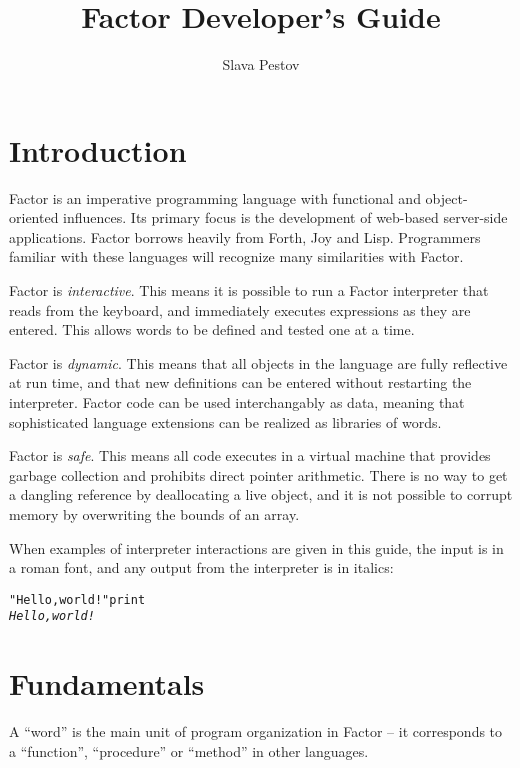 \documentclass[english]{article}
\begin{document}
\title{Factor Developer's Guide}


\author{Slava Pestov}

\maketitle
\tableofcontents{}


\newpage
\section*{Introduction}

Factor is an imperative programming language with functional and object-oriented
influences. Its primary focus is the development of web-based server-side
applications. Factor borrows heavily from Forth, Joy and Lisp. Programmers familiar with these languages will recognize many similarities with Factor.

Factor is \emph{interactive}. This means it is possible to run a Factor interpreter that reads from the keyboard, and immediately executes expressions as they are entered. This allows words to be defined and tested one at a time.

Factor is \emph{dynamic}. This means that all objects in the language are fully reflective at run time, and that new definitions can be entered without restarting the interpreter. Factor code can be used interchangably as data, meaning that sophisticated language extensions can be realized as libraries of words.

Factor is \emph{safe}. This means all code executes in a virtual machine that provides
garbage collection and prohibits direct pointer arithmetic. There is no way to get a dangling reference by deallocating a live object, and it is not possible to corrupt memory by overwriting the bounds of an array.

When examples of interpreter interactions are given in this guide, the input is in a roman font, and any
output from the interpreter is in italics:

\begin{alltt}
"Hello, world!" print
\emph{Hello, world!}
\end{alltt}

\section{Fundamentals}

A ``word'' is the main unit of program organization
in Factor -- it corresponds to a ``function'', ``procedure''
or ``method'' in other languages.
\end{document}
